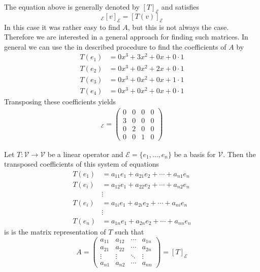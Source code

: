 \begin{exm}
	The equation above is generally denoted by $[T]_\mathcal{E}$ and satisfies
	\begin{equation*}
		[T]_\mathcal{E}[v]_\mathcal{E}=[T(v)]_\mathcal{E}
	\end{equation*}
	In this case it was rather easy to find $A$, but this is not always the case.
	Therefore we are interested in a general approach for finding such matrices.
	In general we can use the in 
	described procedure to find the coefficients of $A$ by
	\begin{align*}
		T(e_1) & =0x^3 + 3x^2 + 0x + 0\cdot1 \\
		T(e_2) & =0x^3 + 0x^2 + 2x + 0\cdot1 \\
		T(e_3) & =0x^3 + 0x^2 + 0x + 1\cdot1 \\
		T(e_4) & =0x^3 + 0x^2 + 0x + 0\cdot1
	\end{align*}
	Transposing these coefficients yields
	\begin{align*}
		[T]_\mathcal{E}=\begin{pmatrix}
			0 & 0 & 0 & 0 \\
			3 & 0 & 0 & 0 \\
			0 & 2 & 0 & 0 \\
			0 & 0 & 1 & 0
		\end{pmatrix}
	\end{align*}
\end{exm}

\begin{rem}\label{rem-matrix-rep-linear-operator}
	Let $T:\mathcal{V}\to\mathcal{V}$ be a linear operator and $\mathcal{E}=\{e_1,\dots,e_n\}$
	be a basis for $\mathcal{V}$. Then the transposed coefficients of this system of equations
	\begin{align*}
		T(e_1) & =a_{11}e_1+a_{21}e_2+\cdots+a_{n1}e_n \\
		T(e_i) & =a_{12}e_1+a_{22}e_2+\cdots+a_{n2}e_n \\
		       & \vdots                                \\
		T(e_i) & =a_{1i}e_1+a_{2i}e_2+\cdots+a_{ni}e_n \\
		       & \vdots                                \\
		T(e_n) & =a_{1n}e_1+a_{2n}e_2+\cdots+a_{nn}e_n
	\end{align*}
	is is the matrix representation of $T$ such that
	\begin{equation*}
		A=\begin{pmatrix}
			a_{11} & a_{12} & \cdots & a_{1n} \\
			a_{21} & a_{22} & \cdots & a_{2n} \\
			\vdots & \vdots & \ddots & \vdots \\
			a_{n1} & a_{n2} & \cdots & a_{nn}
		\end{pmatrix}=[T]_\mathcal{E}
	\end{equation*}
\end{rem}

